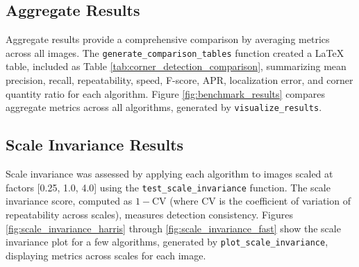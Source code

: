 \documentclass[journal]{IEEEtran}
\begin{document}
\subsection{Aggregate Results}
Aggregate results provide a comprehensive comparison by averaging metrics across all images. The \texttt{generate\_comparison\_tables} function created a LaTeX table, included as Table \ref{tab:corner_detection_comparison}, summarizing mean precision, recall, repeatability, speed, F-score, APR, localization error, and corner quantity ratio for each algorithm. Figure \ref{fig:benchmark_results} compares aggregate metrics across all algorithms, generated by \texttt{visualize\_results}.\\

\begin{figure}[h]
    \centering
\end{figure}

\subsection{Scale Invariance Results}
Scale invariance was assessed by applying each algorithm to images scaled at factors [0.25, 1.0, 4.0] using the \texttt{test\_scale\_invariance} function. The scale invariance score, computed as \( 1 - \text{CV} \) (where CV is the coefficient of variation of repeatability across scales), measures detection consistency. Figures \ref{fig:scale_invariance_harris} through \ref{fig:scale_invariance_fast} show the scale invariance plot for a few algorithms, generated by \texttt{plot\_scale\_invariance}, displaying metrics across scales for each image.\\
\end{document}

